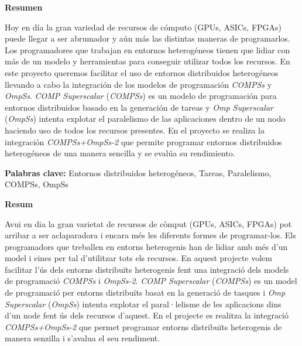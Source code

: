 \afterpage{\blankpage}
\newpage

\noindent
\thispagestyle{plain}
\begin{center}
	\huge{\textbf{Resumen}}
\end{center}

Hoy en día la gran variedad de recursos de cómputo (GPUs, ASICs, FPGAs) puede llegar a ser abrumador y aún más las distintas maneras de programarlos. 
Los programadores que trabajan en entornos heterogéneos tienen que lidiar con más de un modelo y herramientas para conseguir utilizar todos los recursos.
En este proyecto queremos facilitar el uso de entornos distribuidos heterogéneos llevando a cabo la integración de los modelos de programación \textit{COMPSs} y \textit{OmpSs}. \textit{COMP Superscalar} (\textit{COMPSs}) es un modelo de programación para entornos distribuidos basado en la generación de tareas y \textit{Omp Superscalar} (\textit{OmpSs}) intenta explotar el paralelismo de las aplicaciones dentro de un nodo haciendo uso de todos los recursos presentes.
En el proyecto se realiza la integración \textit{COMPSs+OmpSs-2} que permite programar entornos distribuidos heterogéneos de una manera sencilla y se evalúa su rendimiento.

\bigskip

\begin{centering}
	\textbf{Palabras clave:} Entornos distribuidos heterogéneos, Tareas, Paralelismo, COMPSs, OmpSs
\end{centering}


\afterpage{\blankpage}
\newpage

\noindent
\thispagestyle{plain}
\begin{center}
	\huge{\textbf{Resum}}
\end{center}

Avui en dia la gran varietat de recursos de còmput (GPUs, ASICs, FPGAs) pot arribar a ser aclaparadora i encara més les diferents formes de programar-los.
Els programadors que treballen en entorns heterogenis han de lidiar amb més d'un model i eines per tal d'utilitzar tots els recursos. En aquest projecte volem facilitar l'ús dels entorns distribuïts heterogenis fent una integració dels models de programació \textit{COMPSs} i \textit{OmpSs-2}. \textit{COMP Superscalar} (\textit{COMPSs}) es un model de programació per entorns distribuïts basat en la generació de tasques i \textit{Omp Superscalar} (\textit{OmpSs}) intenta explotar el paral·lelisme de les aplicacions dins d'un node fent ús dels recursos d'aquest. En el projecte es realitza la integració \textit{COMPSs+OmpSs-2} que permet programar entorns distribuïts heterogenis de manera senzilla i s'avalua el seu rendiment.

